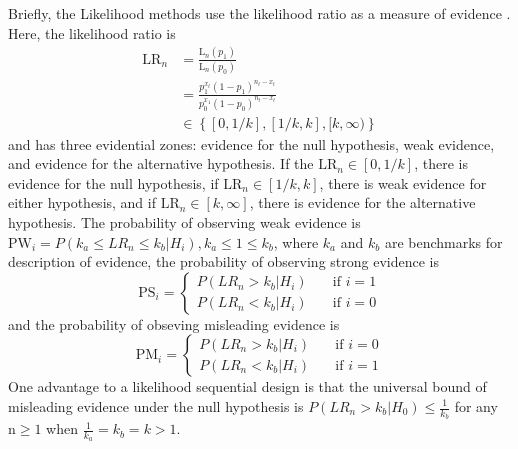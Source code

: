 \documentclass[12pt]{report}\usepackage[]{graphicx}\usepackage[]{color}
\newlength{\li}\setlength{\li}{14.48pt}
\newlength{\di}\setlength{\di}{-3.5mm}
\begin{document}
Briefly, the Likelihood methods use the likelihood ratio as a measure of evidence \cite{Blume}. Here, the likelihood ratio is 
\begin{equation*}
\begin{aligned}
\mbox{LR}_n & = \frac{\mbox{L}_n(p_1)}{\mbox{L}_n(p_0)} \\
&= \frac{p_1^{x_t}(1-p_1)^{n_t-x_t}}{p_0^{x_1}(1-p_0)^{n_t-x_t}} \\
& \in \left\{[0, 1/k], [1/k,k], [k, \infty)\right\}
\end{aligned}
\end{equation*}
and has three evidential zones: evidence for the null hypothesis, weak evidence, and evidence for the alternative hypothesis. If the $\mbox{LR}_n \in [0, 1/k]$, there is evidence for the null hypothesis, if $\mbox{LR}_n \in [1/k,k]$, there is weak evidence for either hypothesis, and if $\mbox{LR}_n \in [k,\infty]$, there is evidence for the alternative hypothesis. The probability of observing weak evidence is $\mbox{PW}_i = P(k_a \leq LR_n \leq k_b | H_i), k_a \leq 1 \leq k_b$, where $k_a$ and $k_b$ are benchmarks for description of evidence, the probability of observing strong evidence is 
$$
\mbox{PS}_i = \left\{
        \begin{array}{ll}
            P(LR_n > k_b|H_i) & \quad \text{if } i = 1 \\
            P(LR_n < k_b|H_i) & \quad \text{if } i = 0
        \end{array}
    \right.
$$
and the probability of obseving misleading evidence is 
$$
\mbox{PM}_i = \left\{
        \begin{array}{ll}
            P(LR_n > k_b|H_i) & \quad \text{if } i = 0 \\
            P(LR_n < k_b|H_i) & \quad \text{if } i = 1
        \end{array}
    \right.
$$
One advantage to a likelihood sequential design is that the universal bound of misleading evidence under the null hypothesis is $P(LR_n > k_b|H_0) \leq \frac{1}{k_b}$ for any $\mbox{n} \geq 1$ when $\frac{1}{k_a} = k_b = k > 1$. \\
\end{document}
